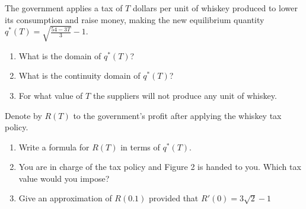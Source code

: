 \documentclass[11pt]{exam}
\begin{document}
\begin{questions}
The government applies a tax of $T$ dollars per unit of whiskey produced to lower its consumption and raise money, making the new equilibrium quantity $q^*(T) = \sqrt{\frac{54 - 3T}{3}} - 1$.
\begin{enumerate}[leftmargin = 0.5cm, label = (\alph*), rightmargin = 0.2cm]
    \item[(e)] What is the domain of $q^*(T)$? 
    \item[(f)] What is the continuity domain of $q^*(T)$?
    \item[(g)] For what value of $T$ the suppliers will not produce any unit of whiskey.
\end{enumerate}

\begin{minipage}{0.51\textwidth}
Denote by $R(T)$ to the government's profit after applying the whiskey tax policy. 
\begin{enumerate}[leftmargin = 0.5cm, label = (\alph*), rightmargin = 0.2cm]
    \item[(h)] Write a formula for $R(T)$ in terms of $q^*(T)$.
    \item[(i)] You are in charge of the tax policy and Figure 2 is handed to you. Which tax value would you impose?
    \item[(j)] Give an approximation of $R(0.1)$ provided that $R'(0) = 3\sqrt{2} -1$
\end{enumerate}
\end{minipage}
\hspace{0.8cm}
\begin{minipage}{0.38\textwidth}
    \vspace{-0.2cm}
    \begin{center}
    
\end{center}
\end{minipage}
\end{questions}
\end{document}
